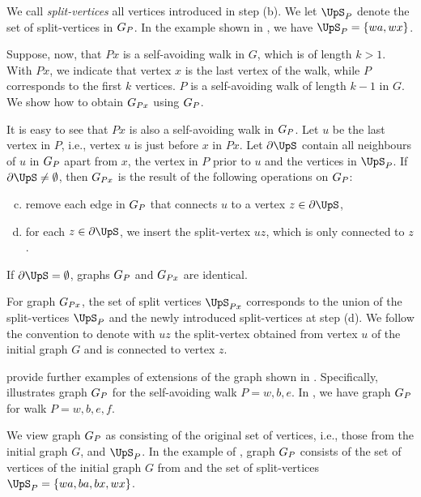 \documentclass[11pt,reqno]{amsart}
\numberwithin{equation}{section}
\newcommand{\blue}[1]{{\color{blue}#1}}
\newcommand{\bluepigment}[1]{{\color{blue(pigment)}#1}}
\newcommand{\cadmiumgreen}[1]{{\color{cadmiumgreen}#1}}
\newcommand{\deeppink}[1]{{\color{deeppink}#1}}
\newcommand{\electricviolet}[1]{{\color{electricviolet}#1}}
\newcommand{\goldenbrown}[1]{{\color{goldenbrown}#1}}
\newcommand{\heliotrope}[1]{{\color{heliotrope}#1}}
\newcommand{\red}[1]{{\color{red}#1}}
\renewcommand{\blue}[1]{#1}
\renewcommand{\bluepigment}[1]{#1}
\renewcommand{\cadmiumgreen}[1]{#1}
\renewcommand{\deeppink}[1]{#1}
\renewcommand{\electricviolet}[1]{#1}
\renewcommand{\goldenbrown}[1]{#1}
\renewcommand{\heliotrope}[1]{#1}
\renewcommand{\red}[1]{#1}
\newcommand{\ka}{\electricviolet{a}}
\newcommand{\kb}{\deeppink{b}}
\newcommand{\kc}{\deeppink{c}}
\newcommand{\ke}{\blue{e}}
\newcommand{\kf}{\deeppink{f}}
\newcommand{\kk}{\bluepigment{k}}
\newcommand{\kP}{\goldenbrown{P}}
\newcommand{\ku}{\red{u}}
\newcommand{\kw}{\blue{w}}
\newcommand{\kx}{\heliotrope{x}}
\newcommand{\kz}{\cadmiumgreen{z}}
\renewcommand{\ka}{a}
\renewcommand{\kb}{b}
\renewcommand{\kc}{x}
\renewcommand{\ke}{e}
\renewcommand{\kf}{f}
\renewcommand{\kk}{k}
\renewcommand{\kP}{P}
\renewcommand{\ku}{u}
\renewcommand{\kw}{w}
\renewcommand{\kx}{x}
\renewcommand{\kz}{z}
\begin{document}
We call {\em split-vertices} all vertices introduced in step (b). 
We let $\ssplit_P$ denote the set of split-vertices in $\gext{G}{\kP}$. 
In the example shown in , we have $\ssplit_{\kP}=\{ \kw \ka, \kw\kc\}$.



Suppose, now, that $\kP \kx$ is a self-avoiding walk in $G$, which is of length $k>1$. 
With $\kP\kx$, we indicate that vertex $\kx$ is the last vertex of the walk, while $\kP$ corresponds 
to the first $\kk$ vertices.
% 
 $\kP$ is a self-avoiding walk of length $\kk-1$ in $G$. We show how to obtain $\gext{G}{\kP\kx}$ using $\gext{G}{\kP}$.

It is easy to see that $\kP\kx$ is also a self-avoiding walk in $\gext{G}{\kP}$. Let $\ku$ be the last vertex in $\kP$, i.e., vertex $\ku$ 
is just before $\kx$ in $\kP\kx$. Let $\sbsplit$ contain all neighbours of $\ku$ in $\gext{G}{\kP}$ 
apart from $\kx$, the vertex in $\kP$ prior to $\ku$ and the vertices in $\ssplit_{\kP}$. 
%
If $\sbsplit\neq \emptyset$, then $\gext{G}{\kP\kx}$ is the result of the following operations on $\gext{G}{\kP}$:
\begin{enumerate}[(a)] \setcounter{enumi}{2}
\item remove each edge in $\gext{G}{\kP}$ that connects $\ku$ to a vertex $\kz\in \sbsplit$,
\item for each $\kz\in \sbsplit$, we insert the split-vertex $\ku\kz$, which is only connected to $\kz$.
\end{enumerate}
If $\sbsplit= \emptyset$, graphs $\gext{G}{\kP}$ and $\gext{G}{\kP\kx}$ are identical. 



For graph $\gext{G}{\kP\kx}$, the set of split vertices $\ssplit_{\kP\kx}$ corresponds to the union of 
the split-vertices $\ssplit_{\kP}$ and the newly introduced split-vertices at step (d). 
We follow the convention to denote with $\ku\kz$ the split-vertex  obtained from 
vertex $\ku$ of the initial graph $G$ and is connected to vertex $\kz$.



 provide further examples of extensions of
the graph shown in . Specifically,  illustrates 
graph $\gext{G}{\kP}$ for the self-avoiding walk $\kP=\kw,\kb,\ke$. In , we have 
graph $\gext{G}{\kP}$ for walk $\kP=\kw,\kb,\ke,\kf$.




We view graph $\gext{G}{\kP}$ as consisting of the original set of vertices, 
i.e., those from the initial graph $G$,  and $\ssplit_{\kP}$. In the example of , graph 
$\gext{G}{\kP}$ consists of the set of vertices of the initial graph $G$ from  and the 
set of split-vertices $\ssplit_{\kP}=\{\kw\ka, \kb\ka, \kb\kc, \kw\kc\}$.
\end{document}
